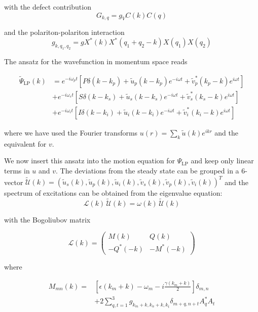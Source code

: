 \documentclass[a4paper,prb,10pt,aps,twocolumn]{revtex4-1}
\begin{document}
with the defect contribution
\begin{equation}
G_{k,q} = g_V C(k) C(q)
\end{equation}

and the polariton-polariton interaction
\begin{equation}
g_{k,q_1,q_2} = g X^*(k) X^*(q_1+q_2-k) X(q_1) X(q_2)
\end{equation}

The ansatz for the wavefunction in momentum space reads

\begin{align}
\widetilde{\Psi}_{\text{LP}}(k) &= e^{-i\omega_p t} \left[P\delta(k-k_p) + 
\widetilde{u}_p(k-k_p) e^{-i \omega t} + \widetilde{v}^*_p(k_p-k) e^{i \omega 
t}\right] \nonumber \\
& + e^{-i\omega_s t} \left[S\delta(k-k_s) + \widetilde{u}_s(k-k_s) e^{-i \omega 
t} + \widetilde{v}^*_s(k_s-k) e^{i \omega t}\right] \nonumber \\
& + e^{-i\omega_i t} \left[I\delta(k-k_i) + \widetilde{u}_i(k-k_i) e^{-i \omega 
t} + \widetilde{v}^*_i(k_i-k) e^{i \omega t}\right]
\end{align}

where we have used the Fourier transforms $u(r)=\sum_k \widetilde{u}(k) e^{ikr}$ 
and the equivalent for $v$. 

We now insert this ansatz into the motion equation for $\Psi_{\text{LP}}$ and 
keep only linear terms in $u$ and $v$.
The deviations from the steady state can be grouped in a 6-vector 
$\widetilde{\mathcal{U}}(k)=(\widetilde{u}_s(k),\widetilde{u}_p(k),\widetilde{u}_i(k),\widetilde{v}_s(k),\widetilde{v}_p(k),\widetilde{v}_i(k))^T$ and the spectrum of excitations can be 
obtained from the eigenvalue equation:
\begin{equation}
\mathcal{L}(k) \,\widetilde{\mathcal{U}}(k)=\omega(k)\, \widetilde{\mathcal{U}}
(k)
\end{equation}



with the Bogoliubov matrix

\begin{equation}
\mathcal{L}(k) =
\begin{pmatrix}
M(k) & Q(k) \\
-Q^*(-k) & -M^*(-k) 
\end{pmatrix}
\end{equation}

where 

\begin{align}
M_{mn}(k)=&\left[\epsilon\left(k_{m}+k\right)-\omega_{m}-
i\frac{\gamma\left(k_{m}+k\right)}{2}\right]\delta_{m,n} \nonumber \\
&+2\sum_{q,t=1}^{3}g_{k_{m}+k,k_{n}+k,k_{t}}\delta_{m+q,n+t}A_{q}^{*}A_{t}
\end{align}
\end{document}
